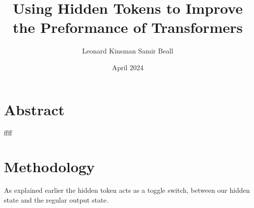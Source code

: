 \documentclass{article}
\title{\vspace{-4cm}Using Hidden Tokens to Improve the Preformance of Transformers}
\author{Leonard Kinsman Samir Beall}
\date{April 2024}
\begin{document}
\maketitle

\section*{Abstract}
ffff
\section*{Methodology}
As explained earlier the hidden token acts as a toggle switch, between our hidden state and the regular output state.
\end{document}
